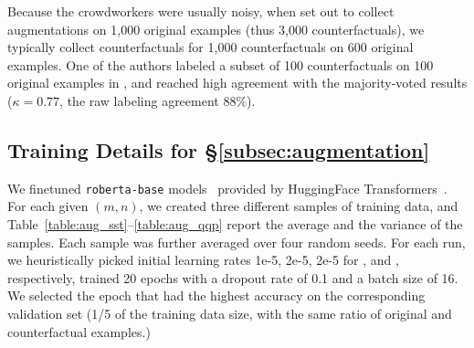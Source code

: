 Because the crowdworkers were usually noisy, when set out to collect augmentations on 1,000 original examples (thus 3,000 counterfactuals), we typically collect counterfactuals for 1,000 counterfactuals on 600 original examples.
One of the authors labeled a subset of 100 counterfactuals on 100 original examples in \sst, and reached high agreement with the majority-voted results ($\kappa=0.77$, the raw labeling agreement $88\%$).


\subsection{Training Details for \S\ref{subsec:augmentation}}
\label{appendix:data_collection}

We finetuned \texttt{roberta-base} models~\cite{liu2019roberta} provided by HuggingFace Transformers~\cite{Wolf2019HuggingFacesTS}.
For each given $(m,n)$, we created three different samples of training data, and Table~\ref{table:aug_sst}--\ref{table:aug_qqp} report the average and the variance of the samples.
Each sample was further averaged over four random seeds.
For each run, we heuristically picked initial learning rates 1e-5, 2e-5, 2e-5 for \sst, \nli and \qqp, respectively, trained 20 epochs with a dropout rate of 0.1 and a batch size of 16. 
We selected the epoch that had the highest accuracy on the corresponding validation set (1/5 of the training data size, with the same ratio of original and counterfactual examples.)

